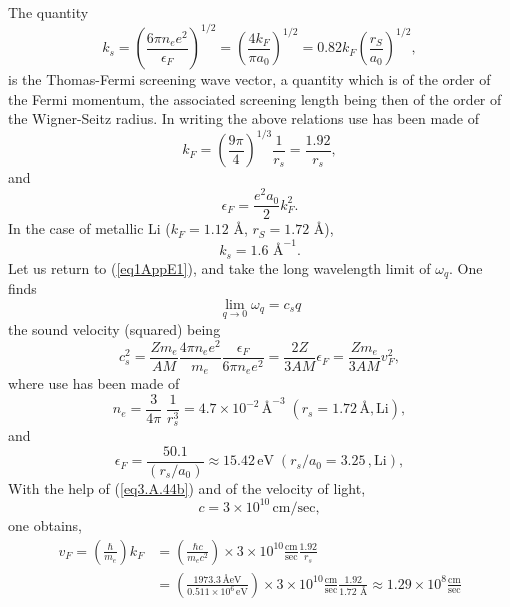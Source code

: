 The quantity
\begin{equation}\label{eq3.A.43}
k_s=\left(\frac{6\pi n_ee^2}{\epsilon_F}\right)^{1/2}=\left(\frac{4k_F}{\pi a_0}\right)^{1/2}=0.82 k_F\left(\frac{r_S}{a_0}\right)^{1/2},
\end{equation}
is the Thomas-Fermi screening wave vector, a quantity which is of the order of the Fermi momentum, the associated screening length being then of the order of the Wigner-Seitz radius. In writing the above relations use has been made of
\begin{equation}\label{eq3.A.44b}
k_F=\left(\frac{9\pi}{4}\right)^{1/3}\frac{1}{r_s}=\frac{1.92}{r_s},
\end{equation}
and
\begin{equation}\label{eq3.A.44}
\epsilon_F=\frac{e^2a_0}{2}k_F^2.
\end{equation}
 In the case of metallic Li ($k_F=1.12$ \AA, $r_S=1.72$ \AA),
\begin{equation}\label{eq3.A.45}
k_s=1.6\text{ \AA}^{-1}.
\end{equation}
 Let us return to (\ref{eq1AppE1}), and take the long wavelength limit of $\omega_q$. One finds
\begin{equation}\label{eq3.A.46}
\lim_{q\to0}\omega_q=c_sq
\end{equation}
 the sound velocity (squared) being 
\begin{equation}\label{eqC2AppA8}
c_s^2=\frac{Zm_e}{AM}\frac{4\pi n_ee^2}{m_e}\frac{\epsilon_F}{6\pi n_e e^2}=\frac{2Z}{3 AM}\epsilon_F=\frac{Zm_e}{3 AM}v_F^2,
\end{equation}
where use has been made of
\begin{equation}\label{eqC2AppA56}
n_e=\frac{3}{4\pi}\;\frac{1}{r_s^3}=4.7\times10^{-2}\,\text{\AA}^{-3}\;(r_s=1.72\,\text{\AA},\text{Li}),
\end{equation}
and
\begin{equation}\label{eqC2AppA57}
\epsilon_F=\frac{50.1}{(r_s/a_0)}\approx 15.42\,\text{eV}\;(r_s/a_0=3.25\,,\text{Li}),
\end{equation}
With the help of (\ref{eq3.A.44b})
 and of the velocity of light,
\begin{equation}\label{eqC2AppA10}
c=3\times 10^{10}\,\text{cm/sec},
\end{equation}
one obtains,
\begin{align}\label{eqC2AppA11}
\nonumber v_F=\left(\frac{\hbar}{m_e}\right)k_F&
=\left(\frac{\hbar c}{m_e c^2}\right)\times 3\times 10^{10}\frac{\text{cm}}{\text{sec}}\frac{1.92}{r_s}\\
&=\left(\frac{1973.3\,\text{\AA eV}}{0.511\times 10^6\,\text{eV}}\right)\times 3\times 10^{10}\frac{\text{cm}}{\text{sec}}\frac{1.92}{1.72\text{ \AA}}
\approx 1.29\times 10^8 \frac{\text{cm}}{\text{sec}}
\end{align}
